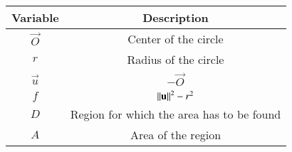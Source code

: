 \begin{tabular}[12pt]{ |c| c|}
    \hline
    \textbf{Variable} & \textbf{Description}\\ 
    \hline
	$\vec{O}$ & Center of the circle\\
    \hline
    $r$ & Radius of the circle\\
    \hline
    $\vec{u}$ & $-\vec{O}$\\
    \hline
    $f$ & $\left\lVert\mathbf{u}\right\rVert^2 - r^2$\\
    \hline
    $D$ & Region for which the area has to be found\\
    \hline
    $A$ & Area of the region\\
    \hline
\end{tabular}